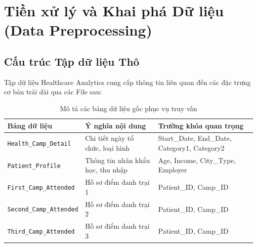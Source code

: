 \documentclass[12pt,a4paper]{article}
\begin{document}
\section{Tiền xử lý và Khai phá Dữ liệu (Data Preprocessing)}

\subsection{Cấu trúc Tập dữ liệu Thô}
Tập dữ liệu Healthcare Analytics cung cấp thông tin liên quan đến các đặc trưng cơ bản trải dài qua các File sau:

\begin{table}[H]
    \centering
    \renewcommand{\arraystretch}{1.2}
    \begin{tabular}{p{4.5cm} p{6cm} p{4.5cm}}
        \toprule
        \rowcolor{lightgray}
        \textbf{Bảng dữ liệu} & \textbf{Ý nghĩa nội dung} & \textbf{Trường khóa quan trọng} \\
        \midrule
        \texttt{Health\_Camp\_Detail} & Chi tiết ngày tổ chức, loại hình & Start\_Date, End\_Date, Category1, Category2 \\
        \texttt{Patient\_Profile} & Thông tin nhân khẩu học, thu nhập & Age, Income, City\_Type, Employer \\
        \texttt{First\_Camp\_Attended} & Hồ sơ điểm danh trại 1 & Patient\_ID, Camp\_ID \\
        \texttt{Second\_Camp\_Attended}& Hồ sơ điểm danh trại 2 & Patient\_ID, Camp\_ID \\
        \texttt{Third\_Camp\_Attended} & Hồ sơ điểm danh trại 3 & Patient\_ID, Camp\_ID \\
        \bottomrule
    \end{tabular}
    \caption{Mô tả các bảng dữ liệu gốc phục vụ truy vấn}
    \label{tab:data_structure_final}
\end{table}
\end{document}
